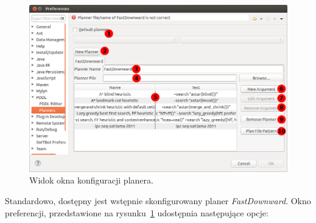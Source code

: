 \begin{figure}[h!]
    \centering
    \includegraphics[width=\textwidth]{img/planner_preferences_window}
    \caption{Widok okna konfiguracji planera.}
    \label{fig:preferences_window}
\end{figure}
Standardowo, dostępny jest wstępnie skonfigurowany planer \emph{FastDownward}. Okno preferencji, przedstawione na rysunku~\ref{fig:preferences_window} udostępnia następujące opcje:

